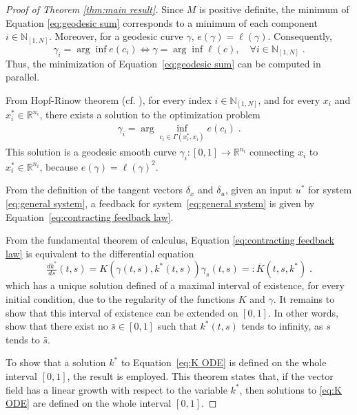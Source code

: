 \documentclass[10pt,twocolumn,twoside]{IEEEtran}
\theoremstyle{plain}
\theoremstyle{definition}
\theoremstyle{remark}
\begin{document}
\begin{proof}[Proof of Theorem \ref{thm:main result}]
	
	Since $M$ is positive definite, the minimum of Equation \eqref{eq:geodesic sum} corresponds to a minimum of each component $i\in\mathbb{N}_{[1,N]}$. Moreover, for a geodesic curve $\gamma$, $e(\gamma)=\ell(\gamma)$. Consequently,
	\begin{equation*}
		\gamma_i=\arg\inf e(c_i)\Leftrightarrow\gamma=\arg\inf\ell(c),\quad\forall i\in\mathbb{N}_{[1,N]}\;.
	\end{equation*}
	Thus, the minimization of Equation~\eqref{eq:geodesic sum} can be computed in parallel. 
	
	From Hopf-Rinow theorem (cf. \cite[Theorem 7.7]{Boothby1986}), for every index $i\in\mathbb{N}_{[1,N]}$, and for every $x_i$ and $x_i^\ast\in\mathbb{R}^{n_i}$, there exists a solution to the optimization problem
	\begin{align*}
		\gamma_i=\arg\inf_{c_i\in\Gamma(x_i^\ast,x_i)} e(c_i)\;.
	\end{align*}
	This solution is a geodesic smooth curve $\gamma_i:[0,1]\to\mathbb{R}^{n_i}$ connecting $x_i$ to $x_i^\ast\in\mathbb{R}^{n_i}$, because $e(\gamma)=\ell(\gamma)^2$.
	
	From the definition of the tangent vectors $\delta_x$ and $\delta_u$, given an input $u^\ast$ for system \eqref{eq:general system}, a feedback for system~\eqref{eq:general system} is given by Equation~\eqref{eq:contracting feedback law}. 
	
	From the fundamental theorem of calculus, Equation \eqref{eq:contracting feedback law} is equivalent to the differential equation
	\begin{equation}\label{eq:K ODE}
		\tfrac{dk^\ast}{ds}(t,s)=K(\gamma(t,s),k^\ast(t,s))\gamma_s(t,s)=:\overline{K}(t,s,k^\ast)\;.
	\end{equation}
	which has a unique solution defined of a maximal interval of existence, for every initial condition, due to the regularity of the functions $K$ and $\gamma$. It remains to show that this interval of existence can be extended on $[0,1]$. In other words, show that there exist no $\bar{s}\in[0,1]$ such that $k^\ast(t,s)$ tends to infinity, as $s$ tends to $\bar{s}$.
	
	To show that a solution $k^\ast$ to Equation~\eqref{eq:K ODE} is defined on the whole interval $[0,1]$, the result  \cite[Theorem 2.12]{Teschl2012} is employed. This theorem states that, if the vector field has a linear growth with respect to the variable $k^\ast$, then solutions to \eqref{eq:K ODE} are defined on the whole interval $[0,1]$.
		

\end{proof}
\end{document}

